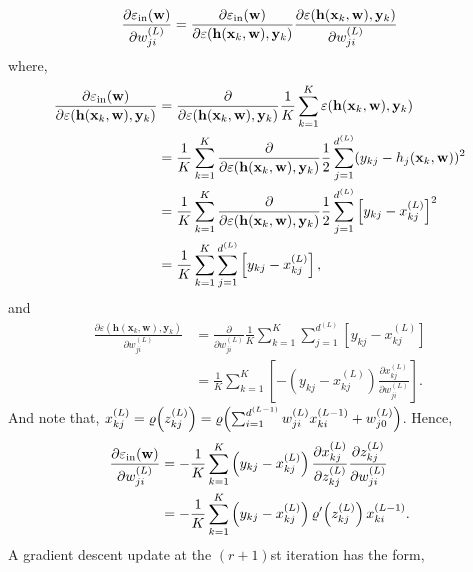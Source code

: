 \begin{equation}
\frac{\partial \varepsilon_{\mathrm{in}}(\mathbf{w})}{\partial w_{ji}^{(L)}}=\frac{\partial \varepsilon_{\mathrm{in}}(\mathbf{w})}{\partial \varepsilon(\mathbf{h}(\mathbf{x}_k,\mathbf{w}),\mathbf{y}_{k})}\frac{\partial \varepsilon(\mathbf{h}(\mathbf{x}_k,\mathbf{w}),\mathbf{y}_{k})}{\partial w_{ji}^{(L)}}
\end{equation}
where,
\begin{align}
\frac{\partial \varepsilon_{\mathrm{in}}(\mathbf{w})}{\partial \varepsilon(\mathbf{h}(\mathbf{x}_k,\mathbf{w}),\mathbf{y}_{k})}&=\frac{\partial}{\partial \varepsilon(\mathbf{h}(\mathbf{x}_k,\mathbf{w}),\mathbf{y}_{k})}\frac{1}{K}\sum_{k=1}^{K}\varepsilon(\mathbf{h}(\mathbf{x}_k,\mathbf{w}),\mathbf{y}_k)\nonumber\\
&=\frac{1}{K}\sum_{k=1}^{K}\frac{\partial}{\partial \varepsilon(\mathbf{h}(\mathbf{x}_k,\mathbf{w}),\mathbf{y}_{k})}\frac{1}{2}\sum_{j=1}^{d^{(L)}}(y_{kj}-h_j(\mathbf{x}_k,\mathbf{w}))^2\nonumber\\
&=\frac{1}{K}\sum_{k=1}^{K}\frac{\partial}{\partial \varepsilon(\mathbf{h}(\mathbf{x}_k,\mathbf{w}),\mathbf{y}_{k})}\frac{1}{2}\sum_{j=1}^{d^{(L)}}\left[y_{kj}-x_{kj}^{(L)}\right]^2\nonumber\\
&=\frac{1}{K}\sum_{k=1}^{K}\sum_{j=1}^{d^{(L)}}\left[y_{kj}-x_{kj}^{(L)}\right],\label{eq:err}
\end{align}
and
\begin{align}
\frac{\partial \varepsilon(\mathbf{h}(\mathbf{x}_k,\mathbf{w}),\mathbf{y}_{k})}{\partial w_{ji}^{(L)}}&=\frac{\partial}{\partial w_{ji}^{(L)}}\frac{1}{K}\sum_{k=1}^{K}\sum_{j=1}^{d^{(L)}}\left[y_{kj}-x_{kj}^{(L)}\right]\nonumber\\
&=\frac{1}{K}\sum_{k=1}^{K}\left[-\left(y_{kj}-x_{kj}^{(L)}\right)\frac{\partial x_{kj}^{(L)}}{\partial w_{ji}^{(L)}}\right].\label{eq:inerr}
\end{align}
And note that, $x_{kj}^{(L)}=\varrho\!\left(z_{kj}^{(L)}\right)=\varrho\!\left(\sum_{i=1}^{d^{(L-1)}}w_{ji}^{(L)}x_{ki}^{(L-1)}+w_{j0}^{(L)}\right)$. Hence,
\begin{align}
\frac{\partial \varepsilon_{\mathrm{in}}(\mathbf{w})}{\partial w_{ji}^{(L)}}&=-\frac{1}{K}\sum_{k=1}^{K}\left(y_{kj}-x_{kj}^{(L)}\right)\frac{\partial x_{kj}^{(L)}}{\partial z_{kj}^{(L)}}\frac{\partial z_{kj}^{(L)}}{\partial w_{ji}^{(L)}}\nonumber\\
&=-\frac{1}{K}\sum_{k=1}^{K}\left(y_{kj}-x_{kj}^{(L)}\right)\varrho'\!\left(z_{kj}^{(L)}\right)x_{ki}^{(L-1)}.\label{eq:grad1}
\end{align}
A gradient descent update at the $(r+1)$st iteration has the form,
